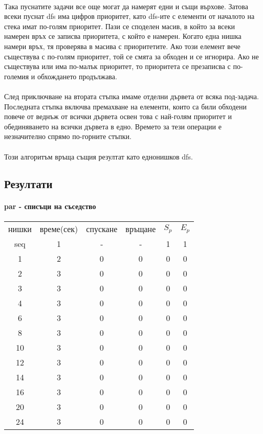 \paragraph*{} Така пуснатите задачи все още могат да намерят едни и същи върхове. Затова всеки пуснат dfs има цифров приоритет, като dfs-ите с елементи от началото на стека имат по-голям приоритет. Пази се споделен масив, в който за всеки намерен връх се записва приоритета, с който е намерен. Когато една нишка намери връх, тя проверява в масива с приоритетите. Ако този елемент вече съществува с по-голям приоритет, той се смята за обходен и се игнорира. Ако не съществува или има по-малък приоритет, то приоритета се презаписва с по-големия и обхождането продължава.

\paragraph*{} След приключване на втората стъпка имаме отделни дървета от всяка под-задача. Последната стъпка включва премахване на елементи, които са били обходени повече от веднъж от всички дървета освен това с най-голям приоритет и обединяването на всички дървета в едно. Времето за тези операции е незначително спрямо по-горните стъпки.

\paragraph*{} Този алгоритъм връща същия резултат като еднонишков dfs.

\subsection{Резултати}

\paragraph*{par - списъци на съседство}

\begin{center}
\begin{tabular}{ c c c c c c }
  нишки & време(сек) & спускане & връщане & $S_p$ & $E_p$ \\
  seq & 1 & - & - & 1 & 1 \\
  1 & 2 & 0 & 0 & 0 & 0 \\
  2 & 3 & 0 & 0 & 0 & 0 \\
  3 & 3 & 0 & 0 & 0 & 0 \\
  4 & 3 & 0 & 0 & 0 & 0 \\
  6 & 3 & 0 & 0 & 0 & 0 \\
  8 & 3 & 0 & 0 & 0 & 0 \\
  10 & 3 & 0 & 0 & 0 & 0 \\
  12 & 3 & 0 & 0 & 0 & 0 \\
  14 & 3 & 0 & 0 & 0 & 0 \\
  16 & 3 & 0 & 0 & 0 & 0 \\
  20 & 3 & 0 & 0 & 0 & 0 \\
  24 & 3 & 0 & 0 & 0 & 0 \\
\end{tabular}
\end{center}


